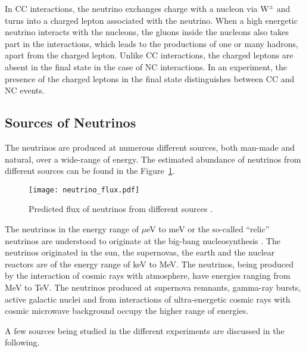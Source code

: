 In CC interactions, the neutrino exchanges charge with a nucleon via
$\mathrm{W}^{\pm}$ and turns into a charged lepton associated with the
neutrino. When a high energetic neutrino interacts with the nucleons,
the gluons inside the nucleons also takes part in the interactions,
which leads to the productions of one or many hadrons, apart from the
charged lepton. Unlike CC interactions, the charged leptons are absent
in the final state in the case of NC interactions. In an experiment,
the presence of the charged leptons in the final state distinguishes
between CC and NC events.

\subsection{Sources of Neutrinos}
The neutrinos are produced at numerous different sources, both
\mbox{man-made} and natural, over a wide-range of energy. The
estimated abundance of neutrinos from different sources can be found
in the Figure~\ref{fig:neutrino_flux}. 
\begin{figure}[h]
  \centering
  \texttt{[image: neutrino\_flux.pdf]}
  \caption{Predicted flux of neutrinos from different sources
    \cite{neutrinoflux}.}
  \label{fig:neutrino_flux}
\end{figure}

The neutrinos in the energy range of $\mu$eV to meV or the so-called
``relic'' neutrinos are understood to originate at the big-bang
nucleosynthesis \cite{nucleosynthesis}. The neutrinos originated in
the sun\cite{raydavis}, the supernovas, the
earth\cite{kamland,borexino} and the nuclear reactors are of the
energy range of keV to MeV. The neutrinos, being produced by the
interaction of cosmic rays with atmosphere, have energies ranging
from MeV to TeV. The neutrinos produced at supernova remnants,
gamma-ray bursts, active galactic nuclei and from interactions of
ultra-energetic cosmic rays with cosmic microwave background occupy
the higher range of energies.

A few sources being studied in the different experiments are discussed
in the following.

